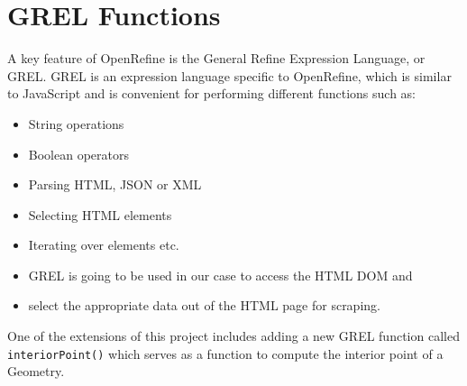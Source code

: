 \section{GREL Functions}
A key feature of OpenRefine is the \“General Refine Expression Language\”, or GREL.
GREL is an expression language specific to OpenRefine, which is similar to JavaScript and is convenient for performing different functions such as:
\begin{itemize}
    \item String operations
    \item Boolean operators
    \item Parsing HTML, JSON or XML
    \item Selecting HTML elements
    \item Iterating over elements etc.
    \item GREL is going to be used in our case to access the HTML DOM and
    \item select the appropriate data out of the HTML page for scraping.
\end{itemize} \cite{OpenRefineCoreDump}
One of the extensions of this project includes adding a new GREL function called \texttt{interiorPoint()}
which serves as a function to compute the interior point of a Geometry.